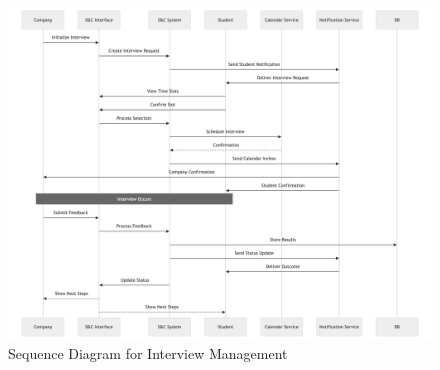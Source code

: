 \begin{figure}[H]
    \begin{center}
        \includegraphics[width=1\linewidth]{JhaBhatiaSharma/Images/Sequence Diagrams/InterviewManagement.png}
        \caption{Sequence Diagram for Interview Management}
        \label{fig:join_a_Tournament_seqd}%
    \end{center}
\end{figure}

